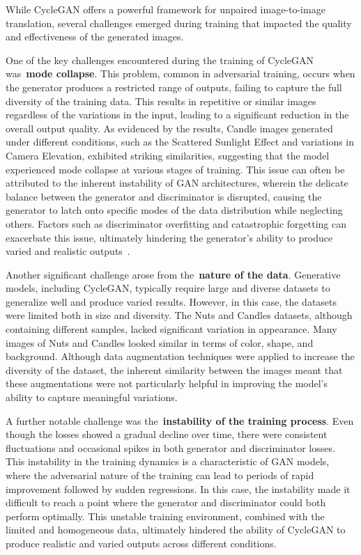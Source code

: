 \documentclass[12pt,DIV14,BCOR12mm,a4paper,footinclude=false,headinclude,parskip=half-,twoside,openright,cleardoublepage=empty,toc=index,bibliography=totoc,listof=totoc]{scrreprt}
\numberwithin{equation}{chapter}
\begin{document}
While CycleGAN offers a powerful framework for unpaired image-to-image translation, several challenges emerged during training that impacted the quality and effectiveness of the generated images.

One of the key challenges encountered during the training of CycleGAN was~\textbf{mode collapse}. This problem, common in adversarial training, occurs when the generator produces a restricted range of outputs, failing to capture the full diversity of the training data. This results in repetitive or similar images regardless of the variations in the input, leading to a significant reduction in the overall output quality. As evidenced by the results, Candle images generated under different conditions, such as the Scattered Sunlight Effect and variations in Camera Elevation, exhibited striking similarities, suggesting that the model experienced mode collapse at various stages of training. This issue can often be attributed to the inherent instability of GAN architectures, wherein the delicate balance between the generator and discriminator is disrupted, causing the generator to latch onto specific modes of the data distribution while neglecting others. Factors such as discriminator overfitting and catastrophic forgetting can exacerbate this issue, ultimately hindering the generator's ability to produce varied and realistic outputs~\cite{modecollapse}.

Another significant challenge arose from the~\textbf{nature of the data}. Generative models, including CycleGAN, typically require large and diverse datasets to generalize well and produce varied results. However, in this case, the datasets were limited both in size and diversity. The Nuts and Candles datasets, although containing different samples, lacked significant variation in appearance. Many images of Nuts and Candles looked similar in terms of color, shape, and background. Although data augmentation techniques were applied to increase the diversity of the dataset, the inherent similarity between the images meant that these augmentations were not particularly helpful in improving the model’s ability to capture meaningful variations.

A further notable challenge was the~\textbf{instability of the training process}. Even though the losses showed a gradual decline over time, there were consistent fluctuations and occasional spikes in both generator and discriminator losses. This instability in the training dynamics is a characteristic of GAN models, where the adversarial nature of the training can lead to periods of rapid improvement followed by sudden regressions. In this case, the instability made it difficult to reach a point where the generator and discriminator could both perform optimally. This unstable training environment, combined with the limited and homogeneous data, ultimately hindered the ability of CycleGAN to produce realistic and varied outputs across different conditions.
\end{document}

